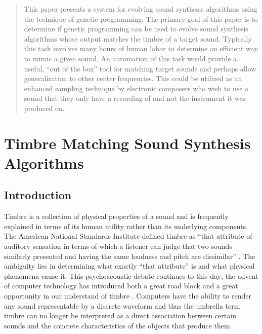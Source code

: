 \documentclass[12pt]{article}
\begin{document}
\maketitle

\begin{abstract}
This paper presents a system for evolving sound synthesis algorithms using the technique of genetic programming. The primary goal of this paper is to determine if genetic programming can be used to evolve sound synthesis algorithms whose output matches the timbre of a target sound. Typically this task involves many hours of human labor to determine an efficient way to mimic a given sound. An automation of this task would provide a useful, ``out of the box'' tool for matching target sounds and perhaps allow generalization to other center frequencies. This could be utilized as an enhanced sampling technique by electronic composers who wish to use a sound that they only have a recording of and not the instrument it was produced on.
\end{abstract}

\section{Timbre Matching Sound Synthesis Algorithms}

\subsection{Introduction}\label{INTRO}
Timbre is a collection of physical properties of a sound and is frequently explained in terms of its human utility rather than its underlying components. The American National Standards Institute defined timbre as ``that attribute of auditory sensation in terms of which a listener can judge that two sounds similarly presented and having the same loudness and pitch are dissimilar'' \citep{american1960american}. The ambiguity lies in determining what exactly ``that attribute'' is and what physical phenomena cause it. This psychoacoustic debate continues to this day; the advent of computer technology has introduced both a great road block and a great opportunity in our understand of timbre \citep{erickson1975sound}. Computers have the ability to render any sound representable by a discrete waveform and thus the umbrella term timbre can no longer be interpreted as a direct association between certain sounds and the concrete characteristics of the objects that produce them.
\end{document}
